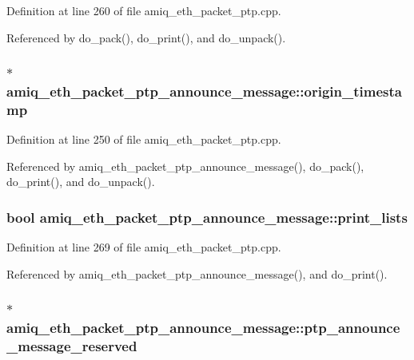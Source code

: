 Definition at line 260 of file amiq\_\-eth\_\-packet\_\-ptp.cpp.

Referenced by do\_\-pack(), do\_\-print(), and do\_\-unpack().\hypertarget{classamiq__eth__packet__ptp__announce__message_a8eb45448fa61158d4a03b9d3e94e1271}{
\subsubsection[{origin\_\-timestamp}]{$\ast$ {\bf amiq\_\-eth\_\-packet\_\-ptp\_\-announce\_\-message::origin\_\-timestamp}}}
\label{classamiq__eth__packet__ptp__announce__message_a8eb45448fa61158d4a03b9d3e94e1271}


Definition at line 250 of file amiq\_\-eth\_\-packet\_\-ptp.cpp.

Referenced by amiq\_\-eth\_\-packet\_\-ptp\_\-announce\_\-message(), do\_\-pack(), do\_\-print(), and do\_\-unpack().\hypertarget{classamiq__eth__packet__ptp__announce__message_abdea2756813db75cbf294607dbc8a78f}{
\subsubsection[{print\_\-lists}]{\setlength{\rightskip}{0pt plus 5cm}bool {\bf amiq\_\-eth\_\-packet\_\-ptp\_\-announce\_\-message::print\_\-lists}}}
\label{classamiq__eth__packet__ptp__announce__message_abdea2756813db75cbf294607dbc8a78f}


Definition at line 269 of file amiq\_\-eth\_\-packet\_\-ptp.cpp.

Referenced by amiq\_\-eth\_\-packet\_\-ptp\_\-announce\_\-message(), and do\_\-print().\hypertarget{classamiq__eth__packet__ptp__announce__message_ad4949245331aa207e7d5780c34c79d8e}{
\subsubsection[{ptp\_\-announce\_\-message\_\-reserved}]{$\ast$ {\bf amiq\_\-eth\_\-packet\_\-ptp\_\-announce\_\-message::ptp\_\-announce\_\-message\_\-reserved}}}
\label{classamiq__eth__packet__ptp__announce__message_ad4949245331aa207e7d5780c34c79d8e}


